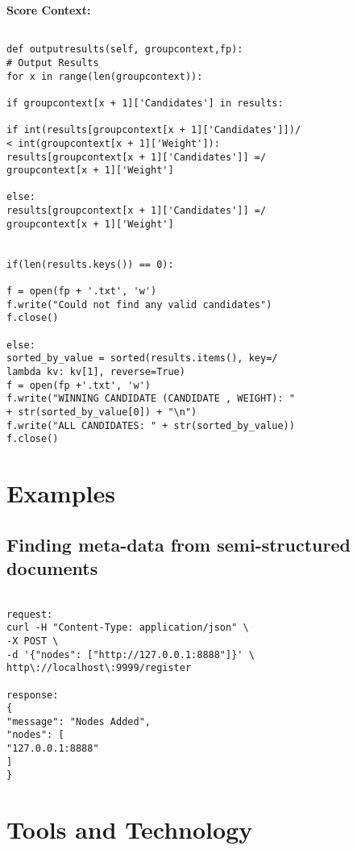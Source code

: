 \bigskip
\noindent
\textbf{Score Context:}
\begin{footnotesize}
\begin{verbatim}

def outputresults(self, groupcontext,fp):
# Output Results
for x in range(len(groupcontext)):

if groupcontext[x + 1]['Candidates'] in results:

if int(results[groupcontext[x + 1]['Candidates']])/
< int(groupcontext[x + 1]['Weight']):
results[groupcontext[x + 1]['Candidates']] =/
groupcontext[x + 1]['Weight']

else:
results[groupcontext[x + 1]['Candidates']] =/ 
groupcontext[x + 1]['Weight']


if(len(results.keys()) == 0):

f = open(fp + '.txt', 'w')
f.write("Could not find any valid candidates")
f.close()

else:
sorted_by_value = sorted(results.items(), key=/
lambda kv: kv[1], reverse=True)
f = open(fp +'.txt', 'w')
f.write("WINNING CANDIDATE (CANDIDATE , WEIGHT): " 
+ str(sorted_by_value[0]) + "\n")
f.write("ALL CANDIDATES: " + str(sorted_by_value))
f.close()
\end{verbatim}
\end{footnotesize}


\section{Examples}

\subsection{Finding meta-data from semi-structured documents}

\bigskip
\noindent
\begin{footnotesize}
\begin{verbatim}

request:
curl -H "Content-Type: application/json" \
-X POST \
-d '{"nodes": ["http://127.0.0.1:8888"]}' \
http\://localhost\:9999/register

response:
{
"message": "Nodes Added",
"nodes": [
"127.0.0.1:8888"
]
}

\end{verbatim}
\end{footnotesize}


\section{Tools and Technology}

